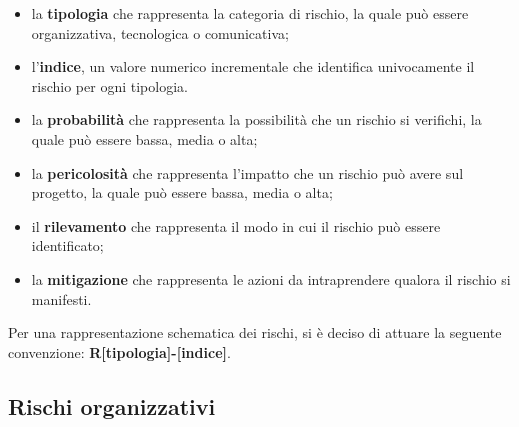 \begin{itemize}
	\item la \textbf{tipologia} che rappresenta la categoria di rischio, la quale può essere organizzativa, tecnologica o comunicativa;
	\item l'\textbf{indice}, un valore numerico incrementale che identifica univocamente il rischio per ogni tipologia.
	\item la \textbf{probabilità} che rappresenta la possibilità che un rischio si verifichi, la quale può essere bassa, media o alta;
	\item la \textbf{pericolosità} che rappresenta l'impatto che un rischio può avere sul progetto, la quale può essere bassa, media o alta;
	\item il \textbf{rilevamento} che rappresenta il modo in cui il rischio può essere identificato;
	\item la \textbf{mitigazione} che rappresenta le azioni da intraprendere qualora il rischio si manifesti.
\end{itemize}
Per una rappresentazione schematica dei rischi, si è deciso di attuare la seguente convenzione: \textbf{R[tipologia]-[indice]}.


\subsection{Rischi organizzativi}


